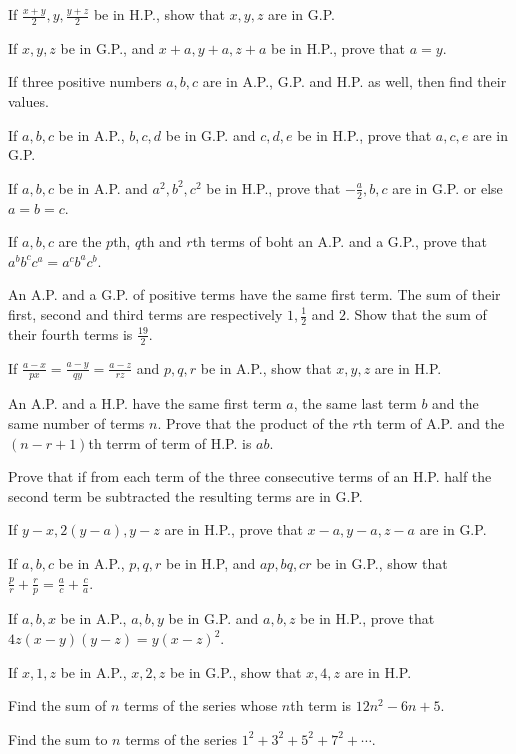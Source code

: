 \item If $\frac{x + y}{2}, y, \frac{y + z}{2}$ be in H.P., show that $x, y, z$ are in G.P.
\item If $x, y, z$ be in G.P., and $x +a , y + a , z + a$ be in H.P., prove that $a = y$.
\item If three positive numbers $a, b, c$ are in A.P., G.P. and H.P. as well, then find their values.
\item If $a, b, c$ be in A.P., $b, c, d$ be in G.P. and $c, d, e$ be in H.P., prove that $a, c, e$ are in
  G.P.
\item If $a, b, c$ be in A.P. and $a^2, b^2, c^2$ be in H.P., prove that $-\frac{a}{2}, b, c$ are in G.P. or
  else $a = b = c$.
\item If $a, b, c$ are the $p$th, $q$th and $r$th terms of boht an A.P. and a G.P., prove that $a^bb^cc^a =
  a^cb^ac^b$.
\item An A.P. and a G.P. of positive terms have the same first term. The sum of their first, second and
  third terms are respectively $1, \frac{1}{2}$ and $2$. Show that the sum of their fourth terms is
  $\frac{19}{2}$.
\item If $\frac{a - x}{px} = \frac{a - y}{qy} = \frac{a - z}{rz}$ and $p, q, r$ be in A.P., show that
  $x, y, z$ are in H.P.
\item An A.P. and a H.P. have the same first term $a$, the same last term $b$ and the same number of terms
  $n$. Prove that the product of the $r$th term of A.P. and the $(n - r + 1)$th terrm of term of H.P. is
  $ab$.
\item Prove that if from each term of the three consecutive terms of an H.P. half the second term be
  subtracted the resulting terms are in G.P.
\item If $y - x, 2(y - a), y - z$ are in H.P., prove that $x - a, y - a, z - a$ are in G.P.
\item If $a, b, c$ be in A.P., $p, q, r$ be in H.P, and $ap, bq, cr$ be in G.P., show that $\frac{p}{r} +
  \frac{r}{p} = \frac{a}{c} + \frac{c}{a}$.
\item If $a, b, x$ be in A.P., $a, b, y$ be in G.P. and $a, b, z$ be in H.P., prove that $4z(x - y)(y - z) =
  y(x - z)^2$.
\item If $x, 1, z$ be in A.P., $x, 2, z$ be in G.P., show that $x, 4, z$ are in H.P.
\item Find the sum of $n$ terms of the series whose $n$th term is $12n^2 - 6n + 5$.
\item Find the sum to $n$ terms of the series $1^2 + 3^2 + 5^2 + 7^2 + \cdots$.
